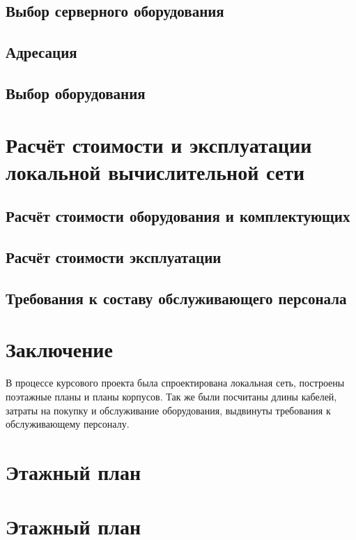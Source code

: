\documentclass[a4paper,14pt,russian]{article}
\begin{document}
\subsection{Выбор серверного оборудования}


\subsection{Адресация}


\subsection{Выбор оборудования}


\section{Расчёт стоимости и эксплуатации локальной вычислительной сети}

\subsection{Расчёт стоимости оборудования и комплектующих}


\subsection{Расчёт стоимости эксплуатации}


\subsection{Требования к составу обслуживающего персонала}


\section*{Заключение}
В процессе курсового проекта была спроектирована локальная сеть, построены поэтажные планы и планы корпусов. Так же были посчитаны длины кабелей, затраты на покупку и обслуживание оборудования, выдвинуты требования к обслуживающему персоналу.

\renewcommand\refname{Список использованных источников}
\nocite{*}


\appendix
\section{Этажный план}
\section{Этажный план}
\end{document}
